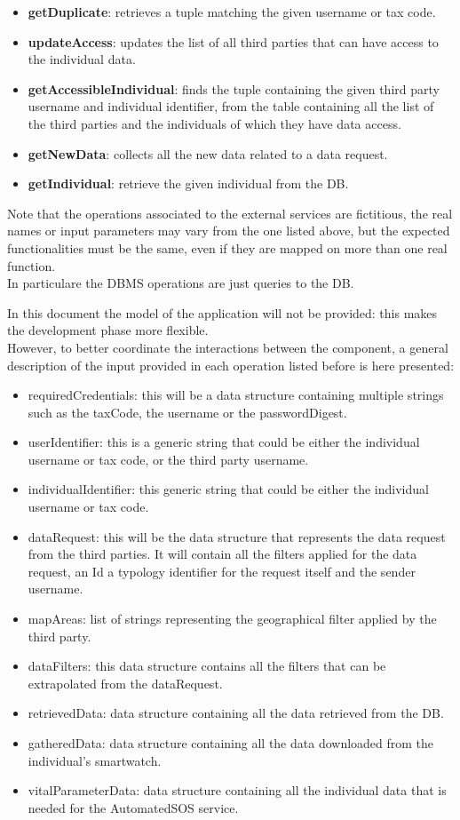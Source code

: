 \begin{itemize}
\begin{itemize}
\item \textbf{getDuplicate}: retrieves a tuple matching the given username or tax code.
\item \textbf{updateAccess}: updates the list of all third parties that can have access to the individual data.
\item \textbf{getAccessibleIndividual}: finds the tuple containing the given third party username and individual identifier, from the table containing all the list of the third parties and the individuals of which they have data access.
\item \textbf{getNewData}: collects all the new data related to a data request.
\item \textbf{getIndividual}: retrieve the given individual from the DB.
\end{itemize}
\end{itemize}
Note that the operations associated to the external services are fictitious, the real names or input parameters may vary from the one listed above, but the expected functionalities must be the same, even if they are mapped on more than one real function.\\
In particulare the DBMS operations are just queries to the DB.

In this document the model of the application will not be provided: this makes the development phase more flexible.\\
However, to better coordinate the interactions between the component, a general description of the input provided in each operation listed before is here presented:
\begin{itemize}
\item requiredCredentials: this will be a data structure containing multiple strings such as the taxCode, the username or the passwordDigest.
\item userIdentifier: this is a generic string that could be either the individual username or tax code, or the third party username.
\item individualIdentifier: this generic string that could be either the individual username or tax code.
\item dataRequest: this will be the data structure that represents the data request from the third parties. It will contain all the filters applied for the data request, an Id a typology identifier for the request itself and the sender username.
\item mapAreas: list of strings representing the geographical filter applied by the third party.
\item dataFilters: this data structure contains all the filters that can be extrapolated from the dataRequest.
\item retrievedData: data structure containing all the data retrieved from the DB.
\item gatheredData: data structure containing all the data downloaded from the individual's smartwatch.
\item vitalParameterData: data structure containing all the individual data that is needed for the AutomatedSOS service.
\end{itemize}





